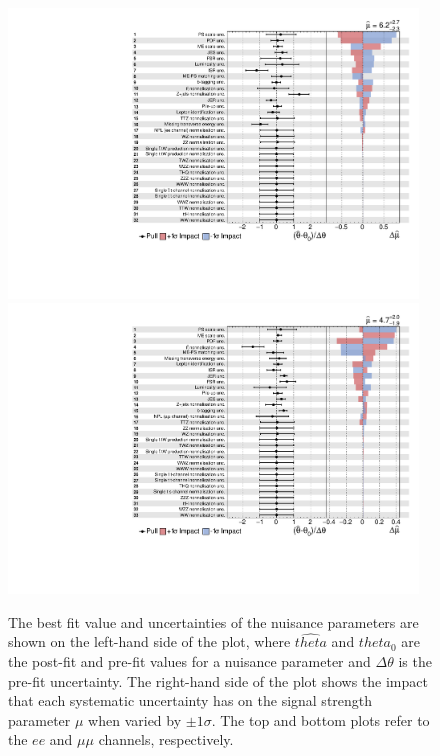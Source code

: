 \begin{figure}[Htbp]
\begin{center}
\includegraphics[width=0.97\textwidth]{figs/results/systematicsImpact_ee.pdf}
\\
\includegraphics[width=0.97\textwidth]{figs/results/systematicsImpact_mumu.pdf}
\caption{The best fit value and uncertainties of the nuisance parameters are shown on the left-hand side of the plot, where $\widehat{theta}$ and $theta_{0}$ are the post-fit and pre-fit values for a nuisance parameter and $\Delta \theta$ is the pre-fit uncertainty.
The right-hand side of the plot shows the impact that each systematic uncertainty has on the signal strength parameter $\mu$ when varied by $\pm 1 \sigma$.
The top and bottom plots refer to the $ee$ and $\mu\mu$ channels, respectively.}
\label{fig:systematicsPull}
\end{center}
\end{figure}


